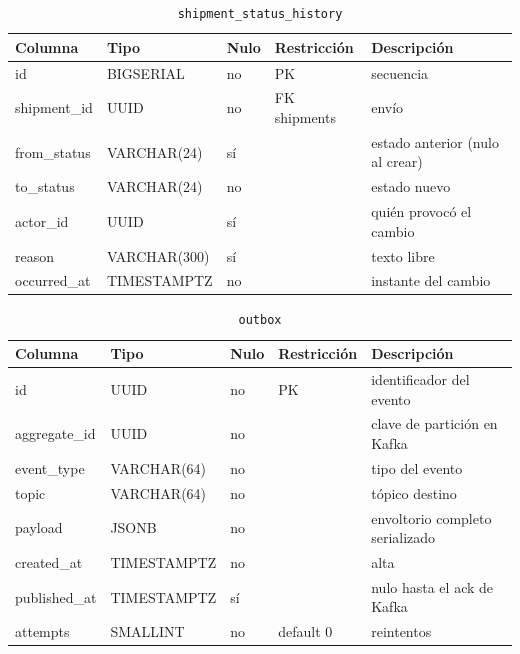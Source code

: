 \documentclass[conference]{IEEEtran}
\newcommand{\pkg}[1]{\texttt{#1}}
\begin{document}
\begin{table}[!t]
\centering
\caption{\pkg{shipment\_status\_history}}

\begin{tabular}{@{}L{3.2cm}L{3.2cm}L{1.1cm}L{3.4cm}L{3.9cm}@{}}
\toprule
\textbf{Columna} & \textbf{Tipo} & \textbf{Nulo} & \textbf{Restricción} & \textbf{Descripción}\\
\midrule
id & BIGSERIAL & no & PK & secuencia\\
shipment\_id & UUID & no & FK shipments & envío\\
from\_status & VARCHAR(24) & sí & & estado anterior (nulo al crear)\\
to\_status & VARCHAR(24) & no & & estado nuevo\\
actor\_id & UUID & sí & & quién provocó el cambio\\
reason & VARCHAR(300) & sí & & texto libre\\
occurred\_at & TIMESTAMPTZ & no & & instante del cambio\\
\bottomrule
\end{tabular}
\end{table}

\begin{table}[!t]
\centering
\caption{\pkg{outbox}}

\begin{tabular}{@{}L{3.2cm}L{3.2cm}L{1.1cm}L{3.4cm}L{3.9cm}@{}}
\toprule
\textbf{Columna} & \textbf{Tipo} & \textbf{Nulo} & \textbf{Restricción} & \textbf{Descripción}\\
\midrule
id & UUID & no & PK & identificador del evento\\
aggregate\_id & UUID & no & & clave de partición en Kafka\\
event\_type & VARCHAR(64) & no & & tipo del evento\\
topic & VARCHAR(64) & no & & tópico destino\\
payload & JSONB & no & & envoltorio completo serializado\\
created\_at & TIMESTAMPTZ & no & & alta\\
published\_at & TIMESTAMPTZ & sí & & nulo hasta el ack de Kafka\\
attempts & SMALLINT & no & default 0 & reintentos\\
\bottomrule
\end{tabular}
\end{table}
\end{document}
